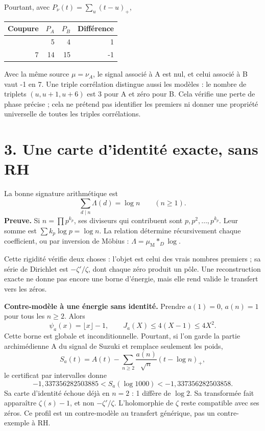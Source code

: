 \documentclass[
  11pt,
]{article}
\begin{document}
Pourtant, avec \(P_\nu(t)=\sum_u(t-u)_+\),

\begin{longtable}[]{@{}rrrr@{}}
\toprule\noalign{}
Coupure & \(P_A\) & \(P_B\) & Différence \\
\midrule\noalign{}
\endhead
\bottomrule\noalign{}
\endlastfoot
3 & 5 & 4 & 1 \\
7 & 14 & 15 & -1 \\
\end{longtable}

Avec la même source \(\mu=\nu_A\), le signal associé à A est nul, et
celui associé à B vaut -1 en 7. Une triple corrélation distingue aussi
les modèles : le nombre de triplets \((u,u+1,u+6)\) est 3 pour A et zéro
pour B. Cela vérifie une perte de phase précise ; cela ne prétend pas
identifier les premiers ni donner une propriété universelle de toutes
les triples corrélations.

\hypertarget{une-carte-didentituxe9-exacte-sans-rh}{%
\section{3. Une carte d'identité exacte, sans
RH}\label{une-carte-didentituxe9-exacte-sans-rh}}

La bonne signature arithmétique est \[
\sum_{d\mid n}\Lambda(d)=\log n\qquad(n\ge1).
\] \textbf{Preuve.} Si \(n=\prod p^{k_p}\), ses diviseurs qui
contribuent sont \(p,p^2,\ldots,p^{k_p}\). Leur somme est
\(\sum k_p\log p=\log n\). La relation détermine récursivement chaque
coefficient, ou par inversion de Möbius :
\(\Lambda=\mu_{\mathrm M}*_{D}\log\).

Cette rigidité vérifie deux choses : l'objet est celui des vrais nombres
premiers ; sa série de Dirichlet est \(-\zeta'/\zeta\), dont chaque zéro
produit un pôle. Une reconstruction exacte ne donne pas encore une borne
d'énergie, mais elle rend valide le transfert vers les zéros.

\textbf{Contre-modèle à une énergie sans identité.} Prendre \(a(1)=0\),
\(a(n)=1\) pour tous les \(n\ge2\). Alors \[
\psi_a(x)=\lfloor x\rfloor-1,\qquad J_a(X)\le4(X-1)\le4X^2.
\] Cette borne est globale et inconditionnelle. Pourtant, si l'on garde
la partie archimédienne A du signal de Suzuki et remplace seulement les
poids, \[
S_a(t)=A(t)-\sum_{n\ge2}\frac{a(n)}{\sqrt n}(t-\log n)_+,
\] le certificat par intervalles donne \[
-1{,}337356282503885<S_a(\log1000)<-1{,}337356282503858.
\] Sa carte d'identité échoue déjà en \(n=2\) : 1 diffère de \(\log2\).
Sa transformée fait apparaître \(\zeta(s)-1\), et non \(-\zeta'/\zeta\).
L'holomorphie de \(\zeta\) reste compatible avec ses zéros. Ce profil
est un contre-modèle au transfert générique, pas un contre-exemple à RH.
\end{document}

